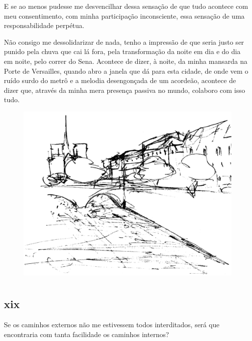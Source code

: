 \noindent{}E se ao menos pudesse me desvencilhar dessa sensação de que
tudo acontece com meu consentimento, com minha participação
inconsciente, essa sensação de uma responsabilidade perpétua.

Não consigo me dessolidarizar de nada, tenho a impressão de que seria
justo ser punido pela chuva que cai lá fora, pela transformação da
noite em dia e do dia em noite, pelo correr do Sena. Acontece de
dizer, à noite, da minha mansarda na Porte de Versailles, quando abro a
janela que dá para esta cidade, de onde vem o ruído surdo do metrô e a
melodia desengonçada de um acordeão, acontece de dizer que, através
da minha mera presença passiva no mundo, colaboro com isso tudo.

\begin{vplace}[.7]
\begin{figure}[!ht]
\includegraphics[width=\textwidth]{./imgs/canal1.png}
\end{figure}
\end{vplace}

\chapter*{}
\section{xix}

\noindent{}Se os caminhos externos não me estivessem todos interditados, será que
encontraria com tanta facilidade os caminhos internos?

